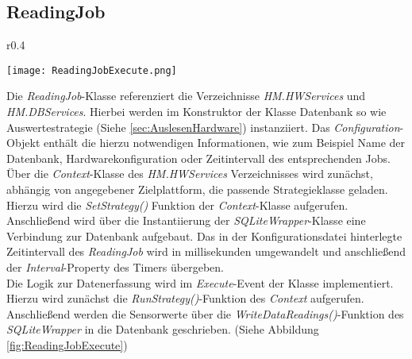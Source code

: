 \subsection{ReadingJob}
\begin{wrapfigure}{r}{0.4\textwidth}
  \captionsetup{justification=centering,format=plain, font=small}
    \vspace{-2cm}
    \begin{center}
      \texttt{[image: ReadingJobExecute.png]}
    \end{center}
    \vspace{-0.5cm}
    \caption{Ablaufdiagram des Execute Events der \textit{ReadingJob}-Klasse}
    \label{fig:ReadingJobExecute}
    \vspace{-1cm}
  \end{wrapfigure}
Die \textit{ReadingJob}-Klasse referenziert die Verzeichnisse \textit{HM.HWServices} und \textit{HM.DBServices}. Hierbei werden im Konstruktor der Klasse Datenbank so wie Auswertestrategie (Siehe \ref{sec:AuslesenHardware}) instanziiert. Das \textit{Configuration}-Objekt enthält die hierzu notwendigen Informationen, wie zum Beispiel Name der Datenbank, Hardwarekonfiguration oder Zeitintervall des entsprechenden Jobs.\\
Über die \textit{Context}-Klasse des \textit{HM.HWServices} Verzeichnisses wird zunächst, abhängig von angegebener Zielplattform, die passende Strategieklasse geladen. Hierzu wird die \textit{SetStrategy()} Funktion der \textit{Context}-Klasse aufgerufen. Anschließend wird über die Instantiierung der \textit{SQLiteWrapper}-Klasse eine Verbindung zur Datenbank aufgebaut. Das in der Konfigurationsdatei hinterlegte Zeitintervall des \textit{ReadingJob} wird in millisekunden umgewandelt und anschließend der \textit{Interval}-Property des Timers übergeben.\\
Die Logik zur Datenerfassung wird im \textit{Execute}-Event der Klasse implementiert. Hierzu wird zunächst die \textit{RunStrategy()}-Funktion des \textit{Context} aufgerufen. Anschließend werden die Sensorwerte über die \textit{WriteDataReadings()}-Funktion des \textit{SQLiteWrapper} in die Datenbank geschrieben. (Siehe Abbildung \ref{fig:ReadingJobExecute})

